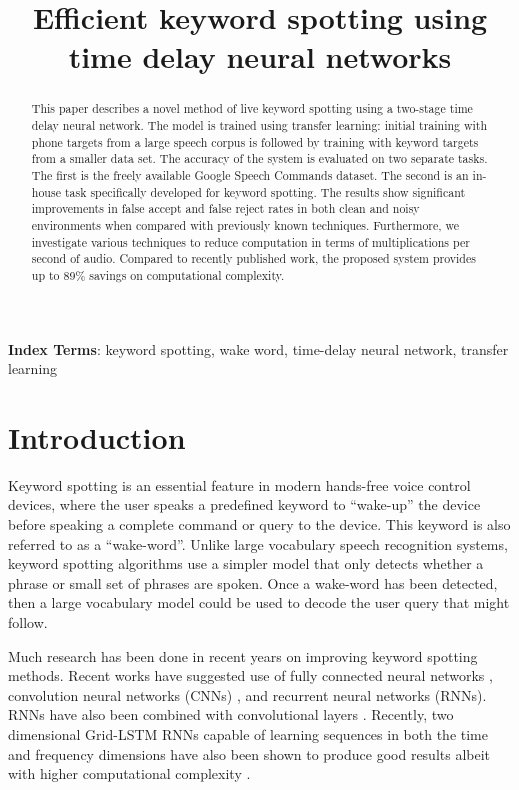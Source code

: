 \documentclass{article}
\title{Efficient keyword spotting using time delay neural networks}
\begin{document}
\maketitle
\begin{abstract}
This paper describes a novel method of live keyword spotting using a two-stage time delay neural network. The model is trained using transfer learning: initial training with phone targets from a large speech corpus is followed by training with keyword targets from a smaller data set.  The accuracy of the system is evaluated on two separate tasks.  The first is the freely available Google Speech Commands dataset. The second is an in-house task specifically developed for keyword spotting.  The results show significant improvements in false accept and false reject rates in both clean and noisy environments when compared with previously known techniques.  Furthermore, we investigate various techniques to reduce computation in terms of multiplications per second of audio.  Compared to recently published work, the proposed system provides up to 89\% savings on computational complexity.
\end{abstract}

\noindent\textbf{Index Terms}:  
keyword spotting, wake word, time-delay neural network, transfer learning

\section{Introduction}
\label{sec:intro}

Keyword spotting is an essential feature in modern hands-free voice control devices, where the user speaks a predefined keyword to ``wake-up'' the device before speaking a complete command or query to the device. This keyword is also referred to as a ``wake-word''. Unlike large vocabulary speech recognition systems, keyword spotting algorithms use a simpler model that only detects whether a phrase or small set of phrases are spoken. Once a wake-word has been detected, then a large vocabulary model could be used to decode the user query that might follow.

Much research has been done in recent years on improving keyword spotting methods. Recent works have suggested use of fully connected neural networks \cite{Chen14}, convolution neural networks (CNNs) \cite{Sainath15,Zhang17}, and recurrent neural networks (RNNs)\cite{Lengerich16, Audhkhasi17}. RNNs have also been combined with convolutional layers \cite{Arik17}. Recently, two dimensional Grid-LSTM RNNs capable of learning sequences in both the time and frequency dimensions have also been shown to produce good results albeit with higher computational complexity \cite{Li17}.
\end{document}
